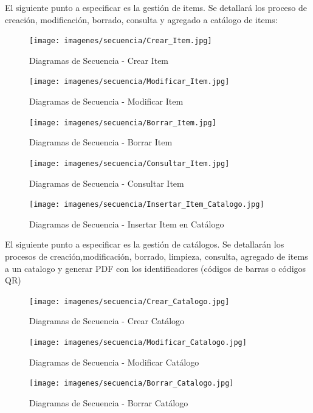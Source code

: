 \documentclass[a4paper,11pt]{book}
\begin{document}
El siguiente punto a especificar es la gestión de items. Se detallará los proceso de creación, modificación, borrado, consulta y agregado a catálogo de items:

\begin{figure}[H] 
\centering 
\texttt{[image: imagenes/secuencia/Crear\_Item.jpg]}
\caption{ Diagramas de Secuencia - Crear Item\cite{diagrama}  }  
\end{figure}

\begin{figure}[H] 
\centering 
\texttt{[image: imagenes/secuencia/Modificar\_Item.jpg]}
\caption{ Diagramas de Secuencia - Modificar Item\cite{diagrama}  }  
\end{figure}

\begin{figure}[H] 
\centering 
\texttt{[image: imagenes/secuencia/Borrar\_Item.jpg]}
\caption{ Diagramas de Secuencia - Borrar Item\cite{diagrama}  }  
\end{figure}

\begin{figure}[H] 
\centering 
\texttt{[image: imagenes/secuencia/Consultar\_Item.jpg]}
\caption{ Diagramas de Secuencia - Consultar Item\cite{diagrama}  }  
\end{figure}

\begin{figure}[H] 
\centering 
\texttt{[image: imagenes/secuencia/Insertar\_Item\_Catalogo.jpg]}
\caption{ Diagramas de Secuencia - Insertar Item en Catálogo\cite{diagrama}  }  
\end{figure}

El siguiente punto a especificar es la gestión de catálogos. Se detallarán los procesos de creación,modificación, borrado, limpieza, consulta, agregado de items a un catalogo y generar PDF con los identificadores (códigos de barras o códigos QR)  

\begin{figure}[H] 
\centering 
\texttt{[image: imagenes/secuencia/Crear\_Catalogo.jpg]}
\caption{ Diagramas de Secuencia - Crear Catálogo\cite{diagrama}  }  
\end{figure}

\begin{figure}[H] 
\centering 
\texttt{[image: imagenes/secuencia/Modificar\_Catalogo.jpg]}
\caption{ Diagramas de Secuencia - Modificar Catálogo\cite{diagrama}  }  
\end{figure}

\begin{figure}[H] 
\centering 
\texttt{[image: imagenes/secuencia/Borrar\_Catalogo.jpg]}
\caption{ Diagramas de Secuencia - Borrar Catálogo\cite{diagrama}  }  
\end{figure}
\end{document}
